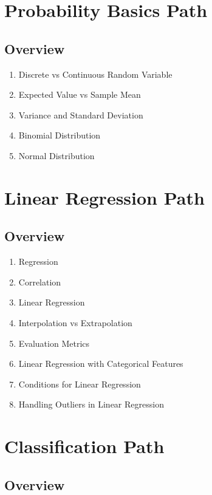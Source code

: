 \documentclass{article}
\begin{document}
\section{Probability Basics Path}
\subsection{Overview}%
\label{sub:Overview}

\begin{enumerate}
    \item Discrete vs Continuous Random Variable
    \item Expected Value vs Sample Mean
    \item Variance and Standard Deviation
    \item Binomial Distribution
    \item Normal Distribution
\end{enumerate}

\section{Linear Regression Path}
\subsection{Overview}%
\label{sub:Overview}

\begin{enumerate}
    \item Regression
    \item Correlation
    \item Linear Regression
    \item Interpolation vs Extrapolation
    \item Evaluation Metrics
    \item Linear Regression with Categorical Features
    \item Conditions for Linear Regression
    \item Handling Outliers in Linear Regression
\end{enumerate}

\section{Classification Path}
\subsection{Overview}%
\label{sub:Overview}
\end{document}
